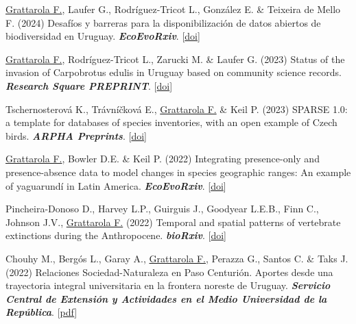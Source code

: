 \documentclass[9pt]{developercv} %
\begin{document}
\begin{etaremune}

\item \underline{Grattarola F.}, Laufer G., Rodríguez-Tricot L., González E. \& Teixeira de Mello F. (2024) Desafíos y barreras para la disponibilización de datos abiertos de biodiversidad en Uruguay. \textit{\textbf{EcoEvoRxiv}}. [\href{https://doi.org/10.32942/X2RK6K}{doi}]

\item \underline{Grattarola F.}, Rodríguez-Tricot L., Zarucki M. \& Laufer G. (2023) Status of the invasion of Carpobrotus edulis in Uruguay based on community science records. \textit{\textbf{Research Square PREPRINT}}. [\href{https://doi.org/10.21203/rs.3.rs-3185397/v1}{doi}]

\item Tschernosterová K., Trávníčková E., \underline{Grattarola F.} \& Keil P. (2023) SPARSE 1.0: a template for databases of species inventories, with an open example of Czech birds. \textit{\textbf{ARPHA Preprints}}. [\href{https://doi.org/10.3897/arphapreprints.e110098}{doi}]

\item \underline{Grattarola F.}, Bowler D.E. \& Keil P. (2022) Integrating presence-only and presence-absence data to model changes in species geographic ranges: An example of yaguarundí in Latin America. \textit{\textbf{EcoEvoRxiv}}. [\href{https://doi.org/10.32942/osf.io/67c4u}{doi}]

\item Pincheira-Donoso D., Harvey L.P., Guirguis J., Goodyear L.E.B., Finn C., Johnson J.V., \underline{Grattarola F.} (2022) Temporal and spatial patterns of vertebrate extinctions during the Anthropocene. \textit{\textbf{bioRxiv}}. [\href{https://doi.org/10.1101/2022.05.05.490605}{doi}]

\end{etaremune}


\begin{etaremune}

\item Chouhy M., Bergós L., Garay A., \underline{Grattarola F.}, Perazza G., Santos C. \& Taks J. (2022) Relaciones Sociedad-Naturaleza en Paso Centurión. Aportes desde una trayectoria integral universitaria en la frontera noreste de Uruguay. \textit{\textbf{Servicio Central de Extensión y Actividades en el Medio Universidad de la República}}. [\href{https://udelar.edu.uy/retema/wp-content/uploads/sites/30/2022/09/relaciones_sociedad-naturaleza_en_paso_centurion-comprimido-1.pdf}{pdf}]

\end{etaremune}
\end{document}
